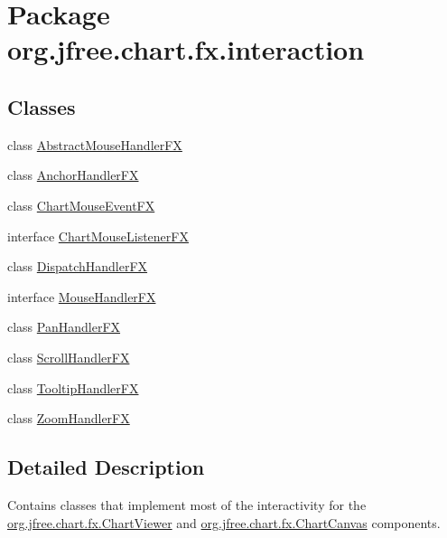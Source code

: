 \hypertarget{namespaceorg_1_1jfree_1_1chart_1_1fx_1_1interaction}{}\section{Package org.\+jfree.\+chart.\+fx.\+interaction}
\label{namespaceorg_1_1jfree_1_1chart_1_1fx_1_1interaction}
\subsection*{Classes}
\begin{DoxyCompactItemize}
\item 
class \mbox{\hyperlink{classorg_1_1jfree_1_1chart_1_1fx_1_1interaction_1_1_abstract_mouse_handler_f_x}{Abstract\+Mouse\+Handler\+FX}}
\item 
class \mbox{\hyperlink{classorg_1_1jfree_1_1chart_1_1fx_1_1interaction_1_1_anchor_handler_f_x}{Anchor\+Handler\+FX}}
\item 
class \mbox{\hyperlink{classorg_1_1jfree_1_1chart_1_1fx_1_1interaction_1_1_chart_mouse_event_f_x}{Chart\+Mouse\+Event\+FX}}
\item 
interface \mbox{\hyperlink{interfaceorg_1_1jfree_1_1chart_1_1fx_1_1interaction_1_1_chart_mouse_listener_f_x}{Chart\+Mouse\+Listener\+FX}}
\item 
class \mbox{\hyperlink{classorg_1_1jfree_1_1chart_1_1fx_1_1interaction_1_1_dispatch_handler_f_x}{Dispatch\+Handler\+FX}}
\item 
interface \mbox{\hyperlink{interfaceorg_1_1jfree_1_1chart_1_1fx_1_1interaction_1_1_mouse_handler_f_x}{Mouse\+Handler\+FX}}
\item 
class \mbox{\hyperlink{classorg_1_1jfree_1_1chart_1_1fx_1_1interaction_1_1_pan_handler_f_x}{Pan\+Handler\+FX}}
\item 
class \mbox{\hyperlink{classorg_1_1jfree_1_1chart_1_1fx_1_1interaction_1_1_scroll_handler_f_x}{Scroll\+Handler\+FX}}
\item 
class \mbox{\hyperlink{classorg_1_1jfree_1_1chart_1_1fx_1_1interaction_1_1_tooltip_handler_f_x}{Tooltip\+Handler\+FX}}
\item 
class \mbox{\hyperlink{classorg_1_1jfree_1_1chart_1_1fx_1_1interaction_1_1_zoom_handler_f_x}{Zoom\+Handler\+FX}}
\end{DoxyCompactItemize}


\subsection{Detailed Description}
Contains classes that implement most of the interactivity for the \mbox{\hyperlink{classorg_1_1jfree_1_1chart_1_1fx_1_1_chart_viewer}{org.\+jfree.\+chart.\+fx.\+Chart\+Viewer}} and \mbox{\hyperlink{classorg_1_1jfree_1_1chart_1_1fx_1_1_chart_canvas}{org.\+jfree.\+chart.\+fx.\+Chart\+Canvas}} components. 